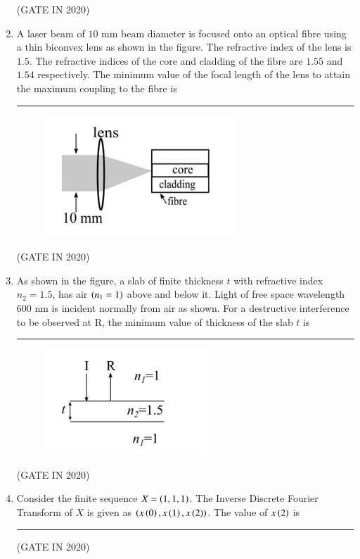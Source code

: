 \documentclass[journal,12pt,onecolumn]{IEEEtran}
\theoremstyle{remark}
\begin{document}
\begin{enumerate}
\hfill{(GATE IN 2020)}

\item A laser beam of $10$ mm beam diameter is focused onto an optical fibre using a thin biconvex lens as shown in the figure. The refractive index of the lens is $1.5$. The refractive indices of the core and cladding of the fibre are $1.55$ and $1.54$ respectively. The minimum value of the focal length of the lens to attain the maximum coupling to the fibre  is \rule{2cm}{0.4pt}
\begin{figure}[H]
\centering
\includegraphics[width=0.4\columnwidth]{figs/q21.jpg}
\caption*{}
\label{fig:q21}
\end{figure}

\hfill{(GATE IN 2020)}

\item As shown in the figure, a slab of finite thickness $t$ with refractive index $n_2 = 1.5$, has air $\left(n_1 = 1\right)$ above and below it. Light of free space wavelength $600$ nm is incident normally from air as shown. For a destructive interference to be observed at R, the minimum value of thickness of the slab $t$  is \rule{2cm}{0.4pt}
\begin{figure}[H]
\centering
\includegraphics[width=0.3\columnwidth]{figs/q22.jpg}
\caption*{}
\label{fig:q22}
\end{figure}

\hfill{(GATE IN 2020)}

\item Consider the finite sequence $X = \left(1, 1, 1\right)$. The Inverse Discrete Fourier Transform  of $X$ is given as $\left(x\left(0\right), x\left(1\right), x\left(2\right)\right)$. The value of $x\left(2\right)$ is \rule{2cm}{0.4pt}

\hfill{(GATE IN 2020)}


\end{enumerate}
\end{document}
